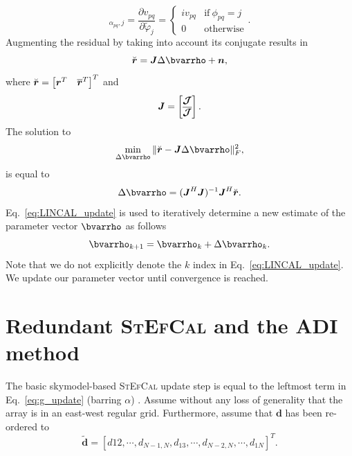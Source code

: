 \documentclass[useAMS,usenatbib]{mn2e}
\newcommand{\br}{\bmath{r}}
\newcommand{\bn}{\bmath{n}}
\newcommand{\bJ}{\bmath{J}}
\newcommand{\bR}{\bmath{R}}
\newcommand{\bmJ}{\bmath{\mathcal{J}}}
\newcommand{\conj}[1]{\overline{#1}}
\begin{document}
\begin{equation}
 [\bR]_{\alpha_{pq},j} =  \frac{\partial v_{pq}}{\partial \widetilde{\varphi}_j} = \begin{cases} 
    i v_{pq} &\textrm{if}~\phi_{pq}=j\\
    0 & \textrm{otherwise}
   \end{cases}.
\end{equation}
Augmenting the residual by taking into account its conjugate results in 
\begin{equation}
\breve{\br} = \bJ \Delta \bvarrho + \bn, 
\end{equation}
where $\breve{\br} = \begin{bmatrix}\br^T & \conj{\br}^T \end{bmatrix}^T$ and 
\begin{equation}
\label{eq:Jac_lin}
\bJ = 
\begin{bmatrix}
 \bmJ\\  
 \conj{\bmJ}
\end{bmatrix}.
\end{equation}
The solution to 
\begin{equation}
 \min_{\Delta \bvarrho} \| \breve{\br} - \bJ \Delta \bvarrho\|_F^2,
\end{equation}
is equal to 
\begin{equation}
\label{eq:LINCAL_update}
\Delta \bvarrho = (\bJ^H\bJ)^{-1} \bJ^H\breve{\br}. 
\end{equation}
Eq.~\eqref{eq:LINCAL_update} is used to iteratively determine a new estimate of the parameter vector $\bvarrho$ as follows
\begin{equation}
\label{eq:new_rho}
\bvarrho_{k+1} = \bvarrho_k + \Delta \bvarrho_k. 
\end{equation}
Note that we do not explicitly denote the $k$ index in Eq.~\eqref{eq:LINCAL_update}. We update our parameter vector until convergence is reached.   

\section{Redundant \textsc{StEfCal} and the ADI method}
\label{sec:red_stef_ADI}
The basic skymodel-based \textsc{StEfCal} update step is equal to  the leftmost term in Eq.~\eqref{eq:g_update} (barring $\alpha$) \citep{Salvini2014}.
Assume without any loss of generality that the array is in an east-west regular grid. Furthermore, assume that $\boldsymbol{d}$ has been re-ordered to
\begin{equation}
\widetilde{\boldsymbol{d}} = \left[d{12},\cdots,d_{N-1,N},d_{13},\cdots,d_{N-2,N},\cdots,d_{1N}\right]^T .
\end{equation}
\end{document}
